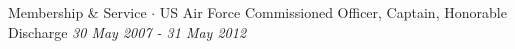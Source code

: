 
\begin{rSection}{Membership \& Service}
  $\cdot$ US Air Force Commissioned Officer, Captain, Honorable Discharge
  \hfill {\em 30 May 2007 - 31 May 2012}
\end{rSection}


